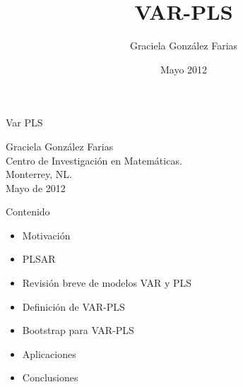 \documentclass{beamer}
\title[VAR-PLS]{VAR-PLS}
\author[Graciela Gonz\'alez Farias] {Graciela Gonz\'alez Farias}
\institute[CIMAT Monterrey]{CIMAT Monterrey\\
Monterrey, NL.}
\date{Mayo 2012}
\newcommand{\?}{?`}
\begin{document}


\begin{frame}
  \begin{center}
    \begin{block}{}
      \begin{center}
        \vspace{3mm}
        {\Large Var PLS}
        \vspace{3mm}
      \end{center}
    \end{block}
    \vspace{5mm}
    Graciela Gonz\'alez Farias \\
    \vspace{5mm}
    {\small Centro de Investigaci\'on en Matem\'aticas.\\
      Monterrey, NL.\\
      Mayo de 2012}
    \vspace{5mm}
  \end{center}
\end{frame}


\begin{frame}{Contenido}
  \begin{itemize}
  \item Motivaci\'on
  \item PLSAR
  \item Revisi\'on breve de modelos VAR y PLS
  \item Definici\'on de VAR-PLS
  \item Bootstrap para VAR-PLS
  \item Aplicaciones
  \item Conclusiones
  \end{itemize}
\end{frame}
\end{document}
